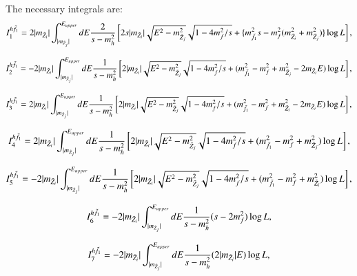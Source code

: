 \documentclass[final,3p,times,pdflatex]{elsarticle}
\begin{document}
The necessary integrals are:
\begin{equation}
I_{1}^{h \tilde{f}_1} = 2|m_{\tilde{Z}_i}|\int_{|m_{\tilde{Z}_j}|}^{E_{upper}} dE {2 \over s-m_{h}^2} \left[2s|m_{\tilde{Z}_i}|\sqrt{E^2 - m_{\tilde{Z}_j}^2}\sqrt{1-4m_{f}^2/s} + \{m_{\tilde{f}_1}^2 s - m_{f}^2 (m_{\tilde{Z}_i}^2 + m_{\tilde{Z}_j}^2)\} \log L\right],
\end{equation}

\begin{equation}
I_{2}^{h \tilde{f}_1} = -2|m_{\tilde{Z}_i}|\int_{|m_{\tilde{Z}_j}|}^{E_{upper}} dE {1 \over s-m_{h}^2} \left[2|m_{\tilde{Z}_i}|\sqrt{E^2 - m_{\tilde{Z}_j}^2}\sqrt{1-4m_{f}^2/s} + (m_{\tilde{f}_1}^2 - m_{f}^2 + m_{\tilde{Z}_j}^2 - 2m_{\tilde{Z}_i}E) \log L\right],
\end{equation}

\begin{equation}
I_{3}^{h \tilde{f}_1} = 2|m_{\tilde{Z}_i}|\int_{|m_{\tilde{Z}_j}|}^{E_{upper}} dE {1 \over s-m_{h}^2} \left[2|m_{\tilde{Z}_i}|\sqrt{E^2 - m_{\tilde{Z}_j}^2}\sqrt{1-4m_{f}^2/s} + (m_{\tilde{f}_1}^2 - m_{f}^2 + m_{\tilde{Z}_i}^2 - 2m_{\tilde{Z}_i}E) \log L\right],
\end{equation}

\begin{equation}
I_{4}^{h \tilde{f}_1} = 2|m_{\tilde{Z}_i}|\int_{|m_{\tilde{Z}_j}|}^{E_{upper}} dE {1 \over s-m_{h}^2} \left[2|m_{\tilde{Z}_i}|\sqrt{E^2 - m_{\tilde{Z}_j}^2}\sqrt{1-4m_{f}^2/s} + (m_{\tilde{f}_1}^2 - m_{f}^2 + m_{\tilde{Z}_j}^2 ) \log L\right],
\end{equation}

\begin{equation}
I_{5}^{h \tilde{f}_1} = -2|m_{\tilde{Z}_i}|\int_{|m_{\tilde{Z}_j}|}^{E_{upper}} dE {1 \over s-m_{h}^2} \left[2|m_{\tilde{Z}_i}|\sqrt{E^2 - m_{\tilde{Z}_j}^2}\sqrt{1-4m_{f}^2/s} + (m_{\tilde{f}_1}^2 - m_{f}^2 + m_{\tilde{Z}_i}^2 ) \log L\right],
\end{equation}

\begin{equation}
I_{6}^{h \tilde{f}_1} = -2|m_{\tilde{Z}_i}|\int_{|m_{\tilde{Z}_j}|}^{E_{upper}} dE {1 \over s-m_{h}^2} (s - 2m_{f}^2) \log L,
\end{equation}

\begin{equation}
I_{7}^{h \tilde{f}_1} = -2|m_{\tilde{Z}_i}|\int_{|m_{\tilde{Z}_j}|}^{E_{upper}} dE {1 \over s-m_{h}^2} (2|m_{\tilde{Z}_i}|E) \log L,
\end{equation}
\end{document}
